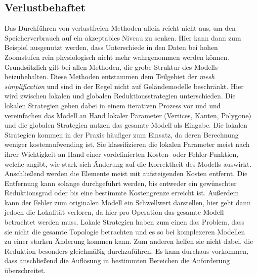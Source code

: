 \subsection{Verlustbehaftet}
Das Durchführen von verlustfreien Methoden allein reicht nicht aus, um den Speicherverbrauch auf ein akzeptables Niveau zu senken. Hier kann dann zum Beispiel ausgenutzt werden, dass Unterschiede in den Daten bei hohen Zoomstufen rein physiologisch nicht mehr wahrgenommen werden können. Grundsätzlich gilt bei allen Methoden, die grobe Struktur des Modells beizubehalten. Diese Methoden entstammen dem Teilgebiet der \textit{mesh simplification} und sind in der Regel nicht auf Geländemodelle beschränkt. Hier wird zwischen lokalen und globalen Reduktionsstrategien unterschieden. Die lokalen Strategien gehen dabei in einem iterativen Prozess vor und und vereinfachen das Modell an Hand lokaler Parameter (Vertices, Kanten, Polygone) und die globalen Strategien nutzen das gesamte Modell als Eingabe. Die lokalen Strategien kommen in der Praxis häufiger zum Einsatz, da deren Berechnung weniger kostenaufwending ist. Sie klassifizieren die lokalen Parameter meist nach ihrer Wichtigkeit an Hand einer vordefinierten Kosten- oder Fehler-Funktion, welche angibt, wie stark sich Änderung auf die Korrektheit des Modells auswirkt. Anschließend werden die Elemente meist mit aufsteigenden Kosten entfernt. Die Entfernung kann solange durchgeführt werden, bis entweder ein gewünschter Reduktionsgrad oder bis eine bestimmte Kostengrenze erreicht ist. Außerdem kann der Fehler zum originalen Modell ein Schwellwert darstellen, hier geht dann jedoch die Lokalität verloren, da hier pro Operation das gesamte Modell betrachtet werden muss\cite[Abschnitt 3]{meshSimplSurvey}. Lokale Strategien haben zum einen das Problem, dass sie nicht die gesamte Topologie betrachten und es so bei komplexeren Modellen zu einer starken Änderung kommen kann. Zum anderen helfen sie nicht dabei, die Reduktion besonders gleichmäßig durchzuführen. Es kann durchaus vorkommen, dass anschließend die Auflösung in bestimmten Bereichen die Anforderung überschreitet.

